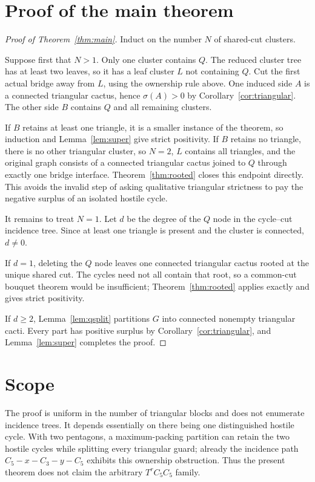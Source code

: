 \documentclass[11pt]{article}
\theoremstyle{remark}
\newcommand{\sig}{\sigma}
\begin{document}
\section{Proof of the main theorem}

\begin{proof}[Proof of Theorem~\ref{thm:main}]
Induct on the number $N$ of shared-cut clusters.

Suppose first that $N>1$.  Only one cluster contains $Q$.  The reduced cluster
tree has at least two leaves, so it has a leaf cluster $L$ not containing $Q$.
Cut the first actual bridge away from $L$, using the ownership rule above.  One
induced side $A$ is a connected triangular cactus, hence
$\sig(A)>0$ by Corollary~\ref{cor:triangular}.  The other side $B$ contains
$Q$ and all remaining clusters.

If $B$ retains at least one triangle, it is a smaller instance of the theorem,
so induction and Lemma~\ref{lem:super} give strict positivity.  If $B$ retains
no triangle, there is no other triangular cluster, so $N=2$, $L$ contains all
triangles, and the original graph consists of a connected triangular cactus
joined to $Q$ through exactly one bridge
interface.  Theorem~\ref{thm:rooted} closes this endpoint directly.  This avoids
the invalid step of asking qualitative triangular strictness to pay the
negative surplus of an isolated hostile cycle.

It remains to treat $N=1$.  Let $d$ be the degree of the $Q$ node in the
cycle--cut incidence tree.  Since at least one triangle is present and the
cluster is connected, $d\ne0$.

If $d=1$, deleting the $Q$ node leaves one connected triangular cactus rooted
at the unique shared cut.  The cycles need not all contain that root, so a
common-cut bouquet theorem would be insufficient; Theorem~\ref{thm:rooted}
applies exactly and gives strict positivity.

If $d\geq2$, Lemma~\ref{lem:qsplit} partitions $G$ into connected nonempty
triangular cacti.  Every part has positive surplus by
Corollary~\ref{cor:triangular}, and Lemma~\ref{lem:super} completes the proof.
\end{proof}

\section{Scope}

The proof is uniform in the number of triangular blocks and does not enumerate
incidence trees.  It depends essentially on there being one distinguished
hostile cycle.  With two pentagons, a maximum-packing partition can retain the
two hostile cycles while splitting every triangular guard; already the
incidence path $C_5-x-C_3-y-C_5$ exhibits this ownership obstruction.  Thus the
present theorem does not claim the arbitrary $T^rC_5C_5$ family.
\end{document}
